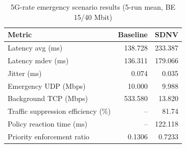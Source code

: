 \begin{table}[t]
\caption{5G-rate emergency scenario results (5-run mean, BE 15/40 Mbit)}
\label{tab:5g-emergency}
\centering
\begin{tabular}{lrr}
\hline
Metric & Baseline & SDNV \\
\hline
Latency avg (ms) & 138.728 & 233.387 \\
Latency mdev (ms) & 136.311 & 179.066 \\
Jitter (ms) & 0.074 & 0.035 \\
Emergency UDP (Mbps) & 10.000 & 9.988 \\
Background TCP (Mbps) & 533.580 & 13.820 \\
Traffic suppression efficiency (\%) & -- & 81.74 \\
Policy reaction time (ms) & -- & 122.118 \\
Priority enforcement ratio & 0.1306 & 0.7233 \\
\hline
\end{tabular}
\end{table}
